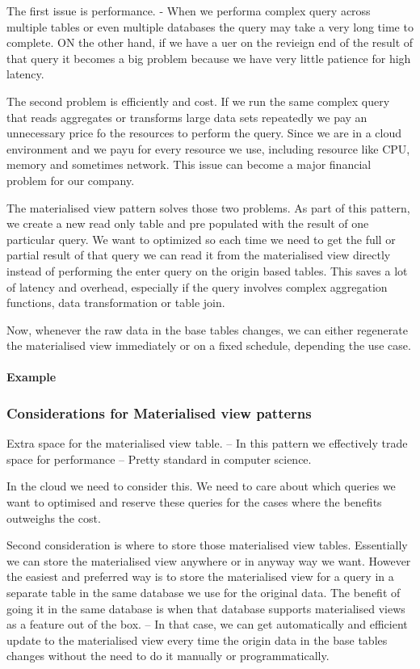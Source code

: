 The first issue is performance.
- When we performa complex query across multiple tables or even multiple databases the query may take a very long time to complete.
ON the other hand, if we have a uer on the revieign end of the result of that query it becomes a big problem because we have very little patience for high latency.

The second problem is efficiently and cost.
If we run the same complex query that reads aggregates or transforms large data sets repeatedly we pay an unnecessary price fo the resources to perform the query.
Since we are in a cloud environment and we payu for every resource we use, including resource like CPU, memory and sometimes network.
This issue can become a major financial problem for our company.

The materialised view pattern solves those two problems.
As part of this pattern, we create a new read only table and pre populated with the result of one particular query.
We want to optimized so each time we need to get the full or partial result of that query we can read it from the materialised view directly instead of performing the enter query on the origin based tables.
This saves a lot of latency and overhead, especially if the query involves complex aggregation functions, data transformation or table join.

Now, whenever the raw data in the base tables changes, we can either regenerate the materialised view immediately or on a fixed schedule, depending the use case.

\paragraph{Example}

\subsubsection{Considerations for Materialised view patterns}
Extra space for the materialised view table.
-- In this pattern we effectively trade space for performance
-- Pretty standard in computer science.

In the cloud we need to consider this.
We need to care about which queries we want to optimised and reserve these queries for the cases where the benefits outweighs the cost.

Second consideration is where to store those materialised view tables.
Essentially we can store the materialised view anywhere or in anyway way we want.
However the easiest and preferred way is to store the materialised view for a query in a separate table in the same database we use for the original data.
The benefit of going it in the same database is when that database supports materialised views as a feature out of the box.
-- In that case, we can get automatically and efficient update to the materialised view every time the origin data in the base tables changes without the need to do it manually or programmatically.

